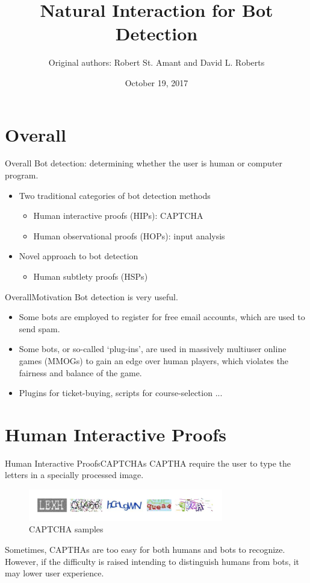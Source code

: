 \documentclass{beamer}
\title[Natural Interaction for Bot Detection]{Natural Interaction for Bot Detection}
\institute{}
\author[by Chen Shaoyuan]{Original authors: Robert St. Amant and David L. Roberts}
\date{October 19, 2017}
\begin{document}
  \begin{frame}
    \titlepage
  \end{frame}

  \section{Overall}
  \begin{frame}{Overall}
    Bot detection: determining whether the user is human or computer program.
    \begin{itemize}
      \item Two traditional categories of bot detection methods
      \begin{itemize}
        \item Human interactive proofs (HIPs): CAPTCHA
        \item Human observational proofs (HOPs): input analysis
      \end{itemize}
      \item Novel approach to bot detection
      \begin{itemize}
        \item Human subtlety proofs (HSPs)
      \end{itemize}
    \end{itemize}
  \end{frame}

  \begin{frame}{Overall}{Motivation}
    Bot detection is very useful.
    \begin{itemize}
      \item Some bots are employed to register for free email accounts, which are used to send spam.
      \item Some bots, or so-called `plug-ins', are used in massively multiuser online games (MMOGs) to gain an edge over human players, which violates the fairness and balance of the game.
      \item Plugins for ticket-buying, scripts for course-selection ...
    \end{itemize}
  \end{frame}

  \section{Human Interactive Proofs}
  \begin{frame}{Human Interactive Proofs}{CAPTCHAs}
    CAPTHA require the user to type the letters in a specially processed image.
    \pause
    \begin{figure}
        \includegraphics[width = 8.5cm]{captcha_samples.pdf}
        \caption{CAPTCHA samples}
    \end{figure}
    \pause
    Sometimes, CAPTHAs are too easy for both humans and bots to recognize. However, if the difficulty is raised intending to distinguish humans from bots, it may lower user experience.
  \end{frame}
\end{document}

